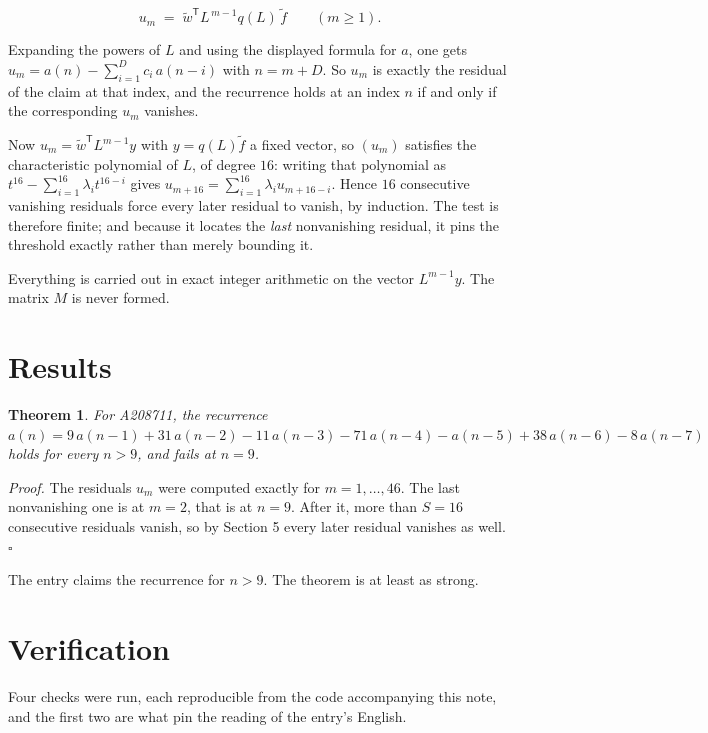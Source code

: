\documentclass[11pt]{article}
\newtheorem{theorem}{Theorem}
\theoremstyle{definition}
\begin{document}
\[u_m \;=\; \tilde w^{\mathsf T} L^{\,m-1} q(L)\,\tilde f \qquad (m \ge 1).\]

Expanding the powers of $L$ and using the displayed formula for $a$, one gets $u_m = a(n) - \sum_{i=1}^{D} c_i\,a(n-i)$ with $n = m + D$. So $u_m$ is exactly the residual of the claim at that index, and the recurrence holds at an index $n$ if and only if the corresponding $u_m$ vanishes.

Now $u_m = \tilde w^{\mathsf T} L^{m-1} y$ with $y = q(L)\tilde f$ a fixed vector, so $(u_m)$ satisfies the characteristic polynomial of $L$, of degree $16$: writing that polynomial as $t^{16} - \sum_{i=1}^{16} \lambda_i t^{16-i}$ gives $u_{m+16} = \sum_{i=1}^{16} \lambda_i u_{m+16-i}$. Hence $16$ consecutive vanishing residuals force every later residual to vanish, by induction. The test is therefore finite; and because it locates the {\itshape last} nonvanishing residual, it pins the threshold exactly rather than merely bounding it.

Everything is carried out in exact integer arithmetic on the vector $L^{m-1}y$. The matrix $M$ is never formed.

\section{Results}

\begin{theorem} For A208711, the recurrence $a(n) = 9\,a(n-1) + 31\,a(n-2) - 11\,a(n-3) - 71\,a(n-4) - a(n-5) + 38\,a(n-6) - 8\,a(n-7)$ holds for every $n > 9$, and fails at $n = 9$.\end{theorem}

{\itshape Proof.} The residuals $u_m$ were computed exactly for $m = 1,\dots,46$. The last nonvanishing one is at $m = 2$, that is at $n = 9$. After it, more than $S = 16$ consecutive residuals vanish, so by Section 5 every later residual vanishes as well. $\square$

The entry claims the recurrence for $n > 9$. The theorem is at least as strong.

\section{Verification}

Four checks were run, each reproducible from the code accompanying this note, and the first two are what pin the reading of the entry's English.
\end{document}
